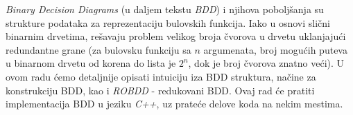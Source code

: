 \emph{Binary Decision Diagrams} (u daljem tekstu \emph{BDD}) i njihova pobolj\v{s}anja su strukture podataka za reprezentaciju bulovskih funkcija. Iako u osnovi sli\v{c}ni binarnim drvetima, re\v{s}avaju problem velikog broja \v{c}vorova u drvetu uklanjaju\'c{}i redundantne grane (za bulovsku funkciju sa $n$ argumenata, broj mogu\'c{}ih puteva u binarnom drvetu od korena do lista je $2^{n}$, dok je broj \v{c}vorova znatno ve\'c{}i). U ovom radu \'c{}emo detaljnije opisati intuiciju iza BDD struktura, na\v{c}ine za konstrukciju BDD, kao i \emph{ROBDD} - redukovani BDD. Ovaj rad \'c{}e pratiti implementacija BDD u jeziku \emph{C++}, uz prate\'c{}e delove koda na nekim mestima.

\cite{BDD}
